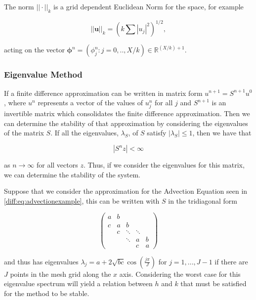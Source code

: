 \documentclass[../main.tex]{subfiles}
\begin{document}
  The norm $|| \cdot ||_k$ is a grid dependent Euclidean Norm for the space, for example

  $$
    || \mathbf{u} ||_k = \left( k \sum |u_j|^2 \right)^{1/2},
  $$

  acting on the vector $\boldsymbol\phi^n = (\phi^n_j : j = 0, .. , X / k) \in \mathbb{R}^{(X / k) + 1}$.

  \subsubsection{Eigenvalue Method}
  If a finite difference approximation can be written in matrix form $u^{n+1} = S^{n+1} u^0$, where $u^n$ represents a vector of the values of $u^n_j$ for all $j$ and $S^{n+1}$ is an invertible matrix which consolidates the finite difference approximation. Then we can determine the stability of that approximation by considering the eigenvalues of the matrix $S$. If all the eigenvalues, $\lambda_S$, of $S$ satisfy $| \lambda_S | \leq 1$, then we have that

  \begin{equation}
    |S^n z | < \infty
  \end{equation}

  as $n \to \infty$ for all vectors $z$. Thus, if we consider the eigenvalues for this matrix, we can determine the stability of the system.

  \begin{example}
    Suppose that we consider the approximation for the Advection Equation seen in \autoref{diff:eq:advectionexample}, this can be written with $S$ in the tridiagonal form

    \begin{equation}
      \begin{pmatrix}
        a & b & \\
        c & a & b \\
          & c & \ddots & \ddots & \\
          &   & \ddots & a & b \\
          &   &        & c & a
      \end{pmatrix}
    \end{equation}

    and thus has eigenvalues $\lambda_j = a + 2 \sqrt{bc} \cos{\left( \frac{j \pi}{J} \right)}$ for $j = 1, ... , J-1$ if there are $J$ points in the mesh grid along the $x$ axis. Considering the worst case for this eigenvalue spectrum will yield a relation between $h$ and $k$ that must be satisfied for the method to be stable.
  \end{example}
\end{document}
